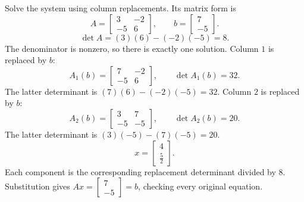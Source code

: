 \goal Solve the system using column replacements. Its matrix form is
\[A=\begin{bmatrix}3&-2\\-5&6\end{bmatrix},\qquad b=\begin{bmatrix}7\\-5\end{bmatrix}.\]
\[\det A=(3)(6)-(-2)(-5)=8.\]
The denominator is nonzero, so there is exactly one solution.
Column $1$ is replaced by $b$:
\[A_1(b)=\begin{bmatrix}7&-2\\-5&6\end{bmatrix},\qquad\det A_1(b)=32.\]
The latter determinant is $(7)(6)-(-2)(-5)=32$.
Column $2$ is replaced by $b$:
\[A_2(b)=\begin{bmatrix}3&7\\-5&-5\end{bmatrix},\qquad\det A_2(b)=20.\]
The latter determinant is $(3)(-5)-(7)(-5)=20$.
\[x=\begin{bmatrix}4\\\frac{5}{2}\end{bmatrix}.\]
Each component is the corresponding replacement determinant divided by $8$. Substitution gives $Ax=\begin{bmatrix}7\\-5\end{bmatrix}=b$, checking every original equation.


